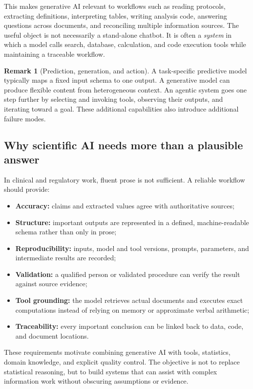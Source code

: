 \documentclass[12pt,oneside]{book}
\numberwithin{equation}{section}
\theoremstyle{definition}
\newtheorem{remark}{Remark}[section]
\theoremstyle{plain}
\theoremstyle{remark}
\begin{document}
This makes generative AI relevant to workflows such as reading protocols,
extracting definitions, interpreting tables, writing analysis code, answering
questions across documents, and reconciling multiple information sources.
The useful object is not necessarily a stand-alone chatbot.  It is often a
\emph{system} in which a model calls search, database, calculation, and code
execution tools while maintaining a traceable workflow.

\begin{remark}[Prediction, generation, and action]
A task-specific predictive model typically maps a fixed input schema to one
output.  A generative model can produce flexible content from heterogeneous
context.  An agentic system goes one step further by selecting and invoking
tools, observing their outputs, and iterating toward a goal.  These additional
capabilities also introduce additional failure modes.
\end{remark}

\subsection{Why scientific AI needs more than a plausible answer}

In clinical and regulatory work, fluent prose is not sufficient.  A reliable
workflow should provide:
\begin{itemize}
    \item \textbf{Accuracy:} claims and extracted values agree with authoritative
    sources;
    \item \textbf{Structure:} important outputs are represented in a defined,
    machine-readable schema rather than only in prose;
    \item \textbf{Reproducibility:} inputs, model and tool versions, prompts,
    parameters, and intermediate results are recorded;
    \item \textbf{Validation:} a qualified person or validated procedure can
    verify the result against source evidence;
    \item \textbf{Tool grounding:} the model retrieves actual documents and
    executes exact computations instead of relying on memory or approximate
    verbal arithmetic;
    \item \textbf{Traceability:} every important conclusion can be linked back
    to data, code, and document locations.
\end{itemize}
These requirements motivate combining generative AI with tools, statistics,
domain knowledge, and explicit quality control.  The objective is not to
replace statistical reasoning, but to build systems that can assist with
complex information work without obscuring assumptions or evidence.
\end{document}
